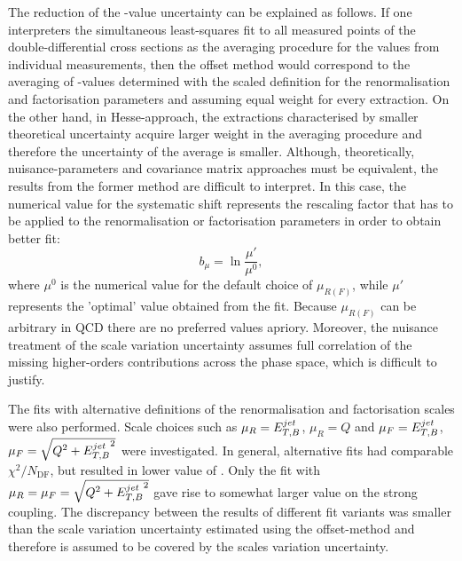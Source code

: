 The reduction of the \asz-value uncertainty can be explained as follows. If one interpreters the simultaneous least-squares fit to all measured points of the double-differential cross sections as the averaging procedure for the \asz values from individual measurements, then the offset method would correspond to the averaging of \asz-values determined with the scaled definition for the renormalisation and factorisation parameters and assuming equal weight for every extraction. On the other hand, in Hesse-approach, the extractions characterised by smaller theoretical uncertainty acquire larger weight in the averaging procedure and therefore the uncertainty of the average \asz is smaller. Although, theoretically, nuisance-parameters and covariance matrix approaches must be equivalent, the results from the former method are difficult to interpret. In this case, the numerical value for the systematic shift represents the rescaling factor that has to be applied to the renormalisation or factorisation parameters in order to obtain better fit:
\begin{equation}
 b_{\mu} = \ln{\frac{\mu'}{\mu^0}},
\end{equation}
where $\mu^{0}$ is the numerical value for the default choice of $\mu_{R(F)}$, while $\mu'$ represents the 'optimal' value obtained from the fit. Because $\mu_{R(F)}$ can be arbitrary in QCD there are no preferred values apriory. Moreover, the nuisance treatment of the scale variation uncertainty assumes full correlation of the missing higher-orders contributions across the phase space, which is difficult to justify.

The fits with alternative definitions of the renormalisation and factorisation scales were also performed. Scale choices such as $\mu_R=\mbox{$E_{T,B}^{jet}$}$, $\mu_R=Q$ and $\mu_F=\mbox{$E_{T,B}^{jet}$}$, $\mu_F=\sqrt{\mbox{${Q^2}$}+\mbox{$E_{T,B}^{jet}$}^2}$ were investigated. In general, alternative fits had comparable $\chi^2/N_\text{DF}$, but resulted in lower value of \asz. Only the fit with $\mu_R=\mu_F=\sqrt{\mbox{${Q^2}$}+\mbox{$E_{T,B}^{jet}$}^2}$ gave rise to somewhat larger value on the strong coupling. The discrepancy between the results of different fit variants was smaller than the scale variation uncertainty estimated using the offset-method and therefore is assumed to be covered by the scales variation uncertainty.

